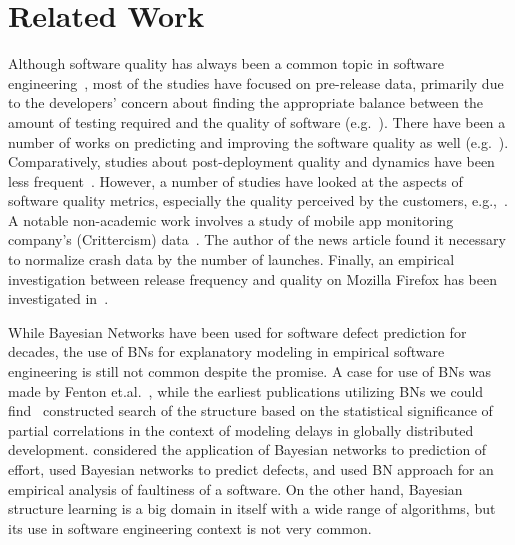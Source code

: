 \documentclass[smallextended]{svjour3}       %
\begin{document}
\section{Related Work}\label{s:relwork}

Although software quality has always been a common
topic in software engineering~\cite{boehm1976quantitative,kitchenham1996software}, most of
the studies have focused on pre-release data, primarily due to the
developers' concern about finding the appropriate balance between
the amount of testing required and the quality of software
(e.g.~\cite{rubin2016challenges,dalal1988should}). There have been a
number of works on predicting and improving the software quality as
well (e.g.~\cite{MHP13,zhang2015towards,KSAHMSU13,MW00}). Comparatively,
studies about post-deployment quality and dynamics have been less
frequent~\cite{li2011characterizing,kenny1993estimating}. However, a
number of studies have looked at the aspects of software quality
metrics, especially the quality perceived by the customers,
e.g.,~\cite{mockus2005predictors,IQ08,hmps15,rotella2011implementing,M14}. A notable
non-academic work involves a study of mobile app monitoring
company's (Crittercism) data~\cite{crittercism12}. The author of the
news article found it necessary to normalize crash data by the
number of launches. Finally, an empirical investigation between
release frequency and quality on Mozilla Firefox has been
investigated in~\cite{khomh2012faster}. 

While Bayesian Networks have been used for software defect prediction 
for decades, the use of BNs for explanatory modeling in
empirical software engineering is still not common despite the
promise. A case for use of BNs was made
by Fenton et.al.~\cite{fenton1999critique,fenton2002software}, while the earliest publications
utilizing BNs we could find~\cite{HM03a} constructed search of the
structure based on the statistical significance of partial
correlations in the context of modeling delays in globally
distributed development. \cite{stamelos2003use,pendharkar2005probabilistic} considered
the application of Bayesian networks to prediction of effort, 
\cite{fenton2007predicting,neil1996predicting,okutan2014software} 
used Bayesian networks to predict defects, and \cite{pai2007empirical} 
used BN approach for an empirical analysis of faultiness of a software. 
On the other hand, Bayesian structure learning is a big domain in itself 
with a wide range of algorithms, but its use in software engineering context 
is not very common.
\end{document}
